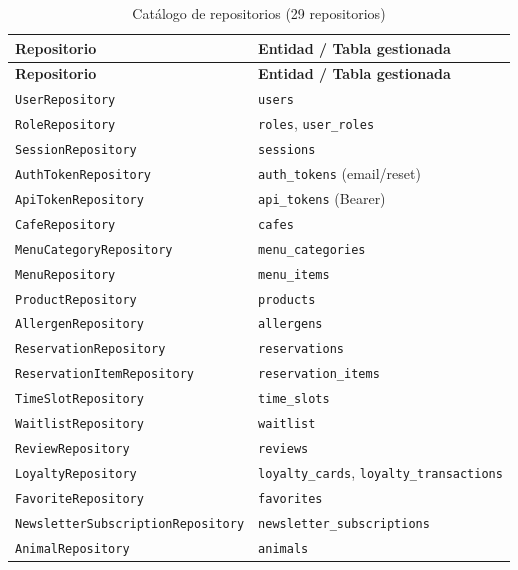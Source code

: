 \documentclass[12pt,a4paper,twoside,openright]{report}
\begin{document}
\begin{longtable}{@{}lp{7cm}@{}}
  \caption{Catálogo de repositorios (29 repositorios)}
  \label{tab:repos}\\
  \toprule
  \textbf{Repositorio} & \textbf{Entidad / Tabla gestionada}\\
  \midrule
  \endfirsthead
  \toprule
  \textbf{Repositorio} & \textbf{Entidad / Tabla gestionada}\\
  \midrule
  \endhead
  \bottomrule
  \endfoot
  \texttt{UserRepository}                  & \texttt{users}\\
  \texttt{RoleRepository}                  & \texttt{roles}, \texttt{user\_roles}\\
  \texttt{SessionRepository}               & \texttt{sessions}\\
  \texttt{AuthTokenRepository}             & \texttt{auth\_tokens} (email/reset)\\
  \texttt{ApiTokenRepository}              & \texttt{api\_tokens} (Bearer)\\
  \texttt{CafeRepository}                  & \texttt{cafes}\\
  \texttt{MenuCategoryRepository}          & \texttt{menu\_categories}\\
  \texttt{MenuRepository}                  & \texttt{menu\_items}\\
  \texttt{ProductRepository}               & \texttt{products}\\
  \texttt{AllergenRepository}              & \texttt{allergens}\\
  \texttt{ReservationRepository}           & \texttt{reservations}\\
  \texttt{ReservationItemRepository}       & \texttt{reservation\_items}\\
  \texttt{TimeSlotRepository}              & \texttt{time\_slots}\\
  \texttt{WaitlistRepository}              & \texttt{waitlist}\\
  \texttt{ReviewRepository}                & \texttt{reviews}\\
  \texttt{LoyaltyRepository}               & \texttt{loyalty\_cards}, \texttt{loyalty\_transactions}\\
  \texttt{FavoriteRepository}              & \texttt{favorites}\\
  \texttt{NewsletterSubscriptionRepository}& \texttt{newsletter\_subscriptions}\\
  \texttt{AnimalRepository}                & \texttt{animals}\\

\end{longtable}
\end{document}

